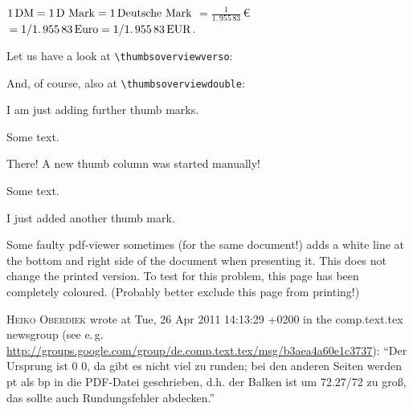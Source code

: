 \documentclass[twoside,british]{article}[2007/10/19]%
\gdef\unit#1{\mathord{\thinspace\mathrm{#1}}}
\begin{document}
$1\unit{DM}=1\unit{D\ Mark}=1\unit{Deutsche\ Mark}$\newline
$=\frac{1}{1.\,955\,83}\,$\euro $\,=1/1.\,955\,83\unit{Euro}=1/1.\,955\,83\unit{EUR}$.

\newpage

Let us have a look at \verb|\thumbsoverviewverso|:

%

\newpage

And, of course, also at \verb|\thumbsoverviewdouble|:

%

\newpage


I am just adding further thumb marks.

\newpage


Some text.

\newpage
\thumbnewcolumn
{}

There! A new thumb column was started manually!

\newpage

Some text.

\newpage


I just added another thumb mark.

\newpage

\pagecolor{green}

\makeatletter
{}%
\makeatother

\label{greenpage}

Some faulty pdf-viewer sometimes (for the same document!)
adds a white line at the bottom and right side of the document
when presenting it. This does not change the printed version.
To test for this problem, this page has been completely coloured.
(Probably better exclude this page from printing!)

\textsc{Heiko Oberdiek} wrote at Tue, 26 Apr 2011 14:13:29 +0200
in the \newline
comp.text.tex newsgroup (see e.\,g. \newline
\url{http://groups.google.com/group/de.comp.text.tex/msg/b3aea4a60e1c3737}):\newline
\textquotedblleft Der Ursprung ist 0 0,
da gibt es nicht viel zu runden; bei den anderen Seiten
werden pt als bp in die PDF-Datei geschrieben, d.h.
der Balken ist um 72.27/72 zu gro\ss{}, das
sollte auch Rundungsfehler abdecken.\textquotedblright
\end{document}
